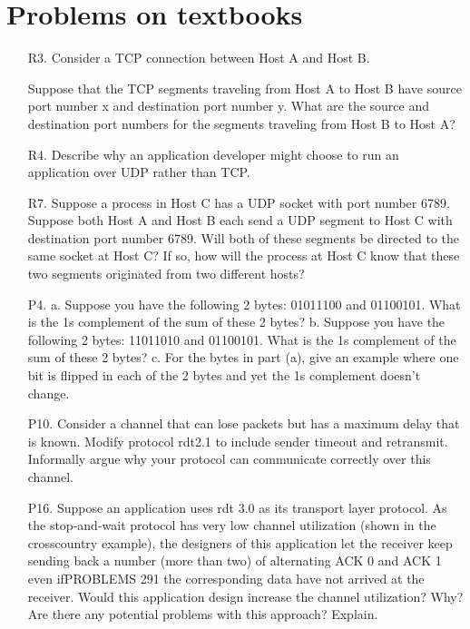\documentclass[]{article}
\begin{document}
\section{Problems on textbooks}
\begin{enumerate}
	\item[R3.] Consider a TCP connection between Host A and Host B. 
	
	Suppose that the TCP segments traveling from Host A to Host B have source port number x and destination port number y. What are the source and destination port numbers for the segments traveling from Host B to Host A?
	
	
	\item[R4.] Describe why an application developer might choose to run an application over UDP rather than TCP.
	
	
	\item[R7.] Suppose a process in Host C has a UDP socket with port number 6789. Suppose both Host A and Host B each send a UDP segment to Host C with destination port number 6789. Will both of these segments be directed to the same socket at Host C? If so, how will the process at Host C know that these two segments originated from two different hosts?
	
	
	\item[P4.] 
	\subitem a. Suppose you have the following 2 bytes: 01011100 and 01100101. What is the 1s complement of the sum of these 2 bytes?
	\subitem b. Suppose you have the following 2 bytes: 11011010 and 01100101. What is the 1s complement of the sum of these 2 bytes?
	\subitem c. For the bytes in part (a), give an example where one bit is flipped in each	of the 2 bytes and yet the 1s complement doesn’t change.
	
	
	\item[P10.] Consider a channel that can lose packets but has a maximum delay that is known. Modify protocol rdt2.1 to include sender timeout and retransmit.	Informally argue why your protocol can communicate correctly over this	channel.
	
	
	\item[P16.] Suppose an application uses rdt 3.0 as its transport layer protocol. As the stop-and-wait protocol has very low channel utilization (shown in the crosscountry example), the designers of this application let the receiver keep sending back a number (more than two) of alternating ACK 0 and ACK 1 even ifPROBLEMS 291	the corresponding data have not arrived at the receiver. Would this application design increase the channel utilization? Why? Are there any potential problems with this approach? Explain.
	
	

\end{enumerate}
\end{document}
